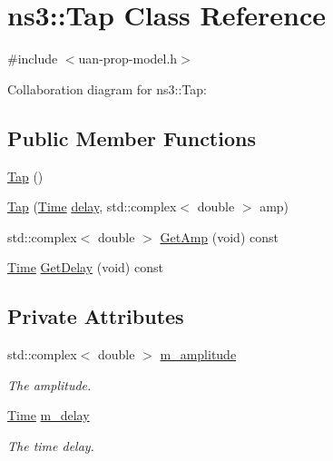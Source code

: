 \hypertarget{classns3_1_1Tap}{}\section{ns3\+:\+:Tap Class Reference}
\label{classns3_1_1Tap}


{\ttfamily \#include $<$uan-\/prop-\/model.\+h$>$}



Collaboration diagram for ns3\+:\+:Tap\+:
\subsection*{Public Member Functions}
\begin{DoxyCompactItemize}
\item 
\hyperlink{classns3_1_1Tap_a56a061aa139af2028454444948f93cef}{Tap} ()
\item 
\hyperlink{classns3_1_1Tap_a3a99407d58d863fa228bdd2c1f343cb5}{Tap} (\hyperlink{classns3_1_1Time}{Time} \hyperlink{mmwave_2model_2fading-traces_2fading__trace__generator_8m_a7964e6aa8f61a9d28973c8267a606ad8}{delay}, std\+::complex$<$ double $>$ amp)
\item 
std\+::complex$<$ double $>$ \hyperlink{classns3_1_1Tap_af79139a9dcb16c42092070b89311388b}{Get\+Amp} (void) const 
\item 
\hyperlink{classns3_1_1Time}{Time} \hyperlink{classns3_1_1Tap_a978cf403fbaca31b8d3ca59a8ab31bfe}{Get\+Delay} (void) const 
\end{DoxyCompactItemize}
\subsection*{Private Attributes}
\begin{DoxyCompactItemize}
\item 
std\+::complex$<$ double $>$ \hyperlink{classns3_1_1Tap_ae51d0f136739f2803e527c86834f0a3b}{m\+\_\+amplitude}
\begin{DoxyCompactList}\small\item\em The amplitude. \end{DoxyCompactList}\item 
\hyperlink{classns3_1_1Time}{Time} \hyperlink{classns3_1_1Tap_a2f88ee3cb0d67aea7e569e51d45a8a53}{m\+\_\+delay}
\begin{DoxyCompactList}\small\item\em The time delay. \end{DoxyCompactList}\end{DoxyCompactItemize}


